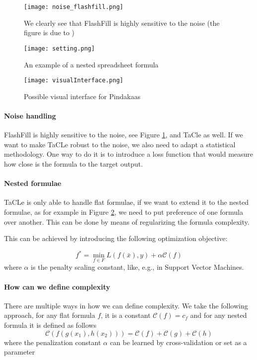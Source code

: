 \begin{figure}[htb]
 \centering
 \texttt{[image: noise\_flashfill.png]}
 \caption{We clearly see that FlashFill is highly sensitive to the
   noise (the figure is due to \textcite{robustfill})}
  \label{fig:flashfill_noise}
\end{figure}

\begin{figure}[htb]
 \centering
 \texttt{[image: setting.png]}
 \caption{An example of a nested spreadsheet formula}
  \label{fig:nested_formula}
\end{figure}

\begin{figure}[htb]
 \centering
 \texttt{[image: visualInterface.png]}
 \caption{Possible visual interface for Pindakaas}
  \label{fig:visual_interface}
\end{figure}

\paragraph{Noise handling} FlashFill is highly sensitive to the noise,
see Figure \ref{fig:flashfill_noise},
and TaCle as well. If we want to make TaCLe robust to the noise, we also need to adapt a
statistical methodology. One way to do it is to introduce a loss
function that would measure how close is the formula to the target
output.

\paragraph{Nested formulae} TaCLe is only able to handle flat
formulae, if we want to extend it to the nested formulae, as for
example in Figure \ref{fig:nested_formula}, we need to
put preference of one formula over another. This can be done by means
of regularizing the formula complexity.

This can be achieved by introducing the following optimization
objective:

  \begin{equation*}
    f^* = \min_{f \in F}{L(f(\bar x),y) + \alpha \mathcal{C}(f)}
  \end{equation*}
  where $\alpha$ is the penalty scaling constant, like, e.g., in Support Vector Machines.

\paragraph{How can we define complexity}
There are multiple ways in how we can define complexity. We take the following approach, for any flat formula $f$, it is a constant $\mathcal{C}(f) = c_f $
     and for any nested formula it is defined as follows
       \begin{equation*}
       \mathcal{C}(f(g(x_1),h(x_2))) = \mathcal{C}(f) + \mathcal{C}(g) + \mathcal{C}(h)
       \end{equation*}
where the penalization constant $\alpha$ can be learned by cross-validation or set as a parameter

